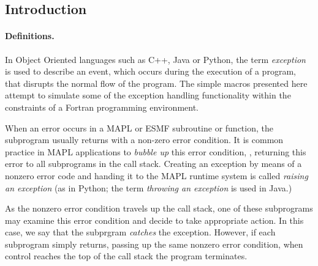 
\def\m#1{{\tt \_\_#1\_\_}}
\def\f#1#2{{\tt \_\_#1\_\_(#2)}}

\subsection*{Introduction}

\paragraph{Definitions.} In Object Oriented languages such as C++, Java or
Python, the term {\em exception} is used to describe an event, which
occurs during the execution of a program, that disrupts the normal
flow of the program. The simple macros presented here attempt to
simulate some of the exception handling functionality within the
constraints of a Fortran programming environment.

When an error occurs in a MAPL or ESMF subroutine or function, the
subprogram usually returns with a non-zero error condition. It is
common practice in MAPL applications to {\em bubble up} this error
condition, , returning this error to all subprograms in the call
stack. Creating an exception by means of a nonzero error code and
handing it to the MAPL runtime system is called {\em raising an exception}
(as in Python; the term {\em throwing an exception} is used in Java.)

As the nonzero error condition travels up the call stack, one of these
subprograms may examine this error condition and decide to take
appropriate action.  In this case, we say that the subprgram {\em
catches} the exception. However, if each subprogram simply returns,
passing up the same nonzero error condition, when control reaches the
top of the call stack the program terminates.

